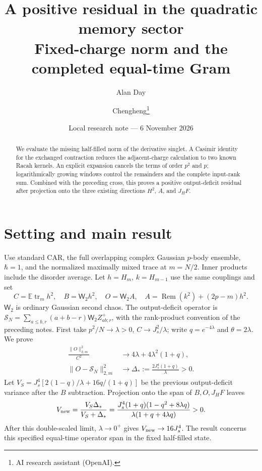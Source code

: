 \documentclass[11pt,a4paper]{article}
\title{A positive residual in the quadratic memory sector\\Fixed-charge norm and the completed equal-time Gram}
\author{Alan Day \and Chengheng\thanks{AI research assistant (OpenAI).}}
\date{Local research note --- 6 November 2026}
\newcommand{\EE}{\mathbb E}
\newcommand{\tr}{\operatorname{tr}}
\newcommand{\Rem}{\operatorname{Rem}}
\newcommand{\W}{\mathsf W_2}
\begin{document}
\maketitle
\begin{abstract}
We evaluate the missing half-filled norm of the derivative singlet.
A Casimir identity for the exchanged contraction reduces the
adjacent-charge calculation to two known Racah kernels. An explicit
expansion cancels the terms of order $p^2$ and $p$; logarithmically
growing windows control the remainders and the complete input-rank
sum. Combined with the preceding cross, this proves a positive
output-deficit residual after projection onto the three existing
directions $H^2$, $A$, and $J_HF$.
\end{abstract}
\section{Setting and main result}
Use standard CAR, the full overlapping complex Gaussian $p$-body
ensemble, $\hbar=1$, and the normalized maximally mixed trace at
$m=N/2$. Inner products include the disorder average. Let
$h=H_m$, $k=H_{m-1}$ use the same couplings and set
\begin{equation}
 C=\EE\tr_m h^2,\quad B=\W h^2,\quad
 O=\W A,\quad A=\Rem(k^2)+(2p-m)h^2.
\end{equation}
$\W$ is ordinary Gaussian second chaos. The output-deficit operator
is $\mathcal S_N=\sum_{a\leq b,r}(a+b-r)\W Z^+_{ab;r}$,
with the rank-product convention of the preceding notes.
First take $p^2/N\to\lambda>0$, $C\to J_s^2/\lambda$;
write $q=e^{-4\lambda}$ and $\theta=2\lambda$. We prove
\begin{align}
 \frac{\|O\|_{2,m}^2}{C^2}&\longrightarrow
       4\lambda+4\lambda^2(1+q),\label{Aresult}\\
 \|O-\mathcal S_N\|_{2,m}^2&\longrightarrow
       \Delta_*:=\frac{2J_s^4(1+q)}\lambda>0.\label{difference}
\end{align}
Let $V_S=J_s^4[2(1-q)/\lambda+16q/(1+q)]$ be the
previous output-deficit variance after the $B$ subtraction.
Projection onto the span of $B,O,J_HF$ leaves
\begin{equation}
 V_{\rm new}=\frac{V_S\Delta_*}{V_S+\Delta_*}
 =\frac{J_s^4(1+q)(1-q^2+8\lambda q)}
 {\lambda(1+q+4\lambda q)}>0.\label{new}
\end{equation}
After this double-scaled limit, $\lambda\to0^+$ gives
$V_{\rm new}\to16J_s^4$. The result concerns this specified
equal-time operator span in the fixed half-filled state.
\end{document}
